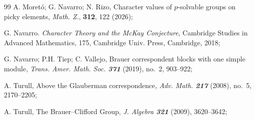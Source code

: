 \documentclass[12pt]{amsart}
\theoremstyle{remark}
\theoremstyle{definition}
\theoremstyle{plain}
\theoremstyle{definition}
\numberwithin{equation}{section}
\begin{document}
\begin{thebibliography}{99}
	{\sc A. Moretó; G. Navarro; N. Rizo}, Character values of $p$-solvable groups on picky elements, \emph{Math. Z.}, {\bf 312}, 122 (2026);
	
	{\sc G. Navarro}. \emph{Character Theory and the McKay Conjecture}, Cambridge Studies in Advanced Mathematics, 175, Cambridge Univ. Press, Cambridge, 2018;
	
	{\sc G. Navarro; P.H. Tiep; C. Vallejo}, Brauer correspondent blocks with one simple module, \emph{Trans. Amer. Math. Soc. {\bf 371}} (2019), no.~2, 903--922;
	
	{\sc A. Turull}, Above the Glauberman correspondence, \emph{Adv. Math. {\bf 217}} (2008), no.~5, 2170--2205; 
	
	{\sc A. Turull}, The Brauer--Clifford Group, \emph{J. Algebra {\bf 321}} (2009), 3620--3642;
\end{thebibliography}

\end{document}
